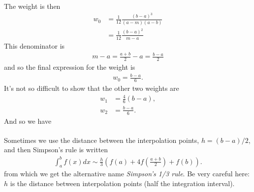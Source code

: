 The weight is then
\begin{align*}
w_0 &= \frac{1}{12} \frac{\left(b - a\right)^3}{(a-m)(a-b)} \\
 &= \frac{1}{12} \frac{\left(b - a\right)^2}{m-a}
\end{align*}
This denominator is
\begin{align*}
m-a = \frac{a+b}{2}-a = \frac{b-a}{2}
\end{align*}
and so the final expression for the weight is
\begin{align*}
w_0 = \frac{b-a}{6}.
\end{align*}
It's not so difficult to show that the other two weights are
\begin{align*}
w_1 &= \frac{4}{6}\left(b-a\right), \\
w_2 &= \frac{b-a}{6}.
\end{align*}
And so we have \\

\noindent {} \\

\noindent Sometimes we use the distance between the interpolation points, $h=(b-a)/2$, and then Simpson's rule is written
\begin{align*}
\int_a^b f(x)dx \sim \frac{h}{3}\left(f(a) + 4f\left(\frac{a+b}{2}\right)+ f(b) \right).
\end{align*}
from which we get the alternative name \textit{Simpson's 1/3 rule}. Be very careful here: $h$ is the distance between interpolation points (half the integration interval).

